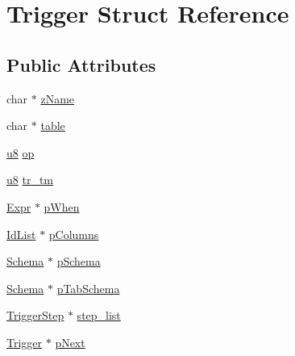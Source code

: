 \hypertarget{struct_trigger}{\section{Trigger Struct Reference}
\label{struct_trigger}
}
\subsection*{Public Attributes}
\begin{DoxyCompactItemize}
\item 
char $\ast$ \hyperlink{struct_trigger_a9aecea5dadd7ae93b7f585c4b914791c}{z\-Name}
\item 
char $\ast$ \hyperlink{struct_trigger_ab9d5500f7fc43382e867733a2968ecae}{table}
\item 
\hyperlink{sqlite3_8c_a74a0f6424ae628af25f23f0a35f6ead3}{u8} \hyperlink{struct_trigger_a855d6b6a302d8d80e1d30ddd70fd403e}{op}
\item 
\hyperlink{sqlite3_8c_a74a0f6424ae628af25f23f0a35f6ead3}{u8} \hyperlink{struct_trigger_af0d10da140b068bfd76aaeb6607fa6cf}{tr\-\_\-tm}
\item 
\hyperlink{struct_expr}{Expr} $\ast$ \hyperlink{struct_trigger_a1b6cdd46e8b98562920d1acee86281ed}{p\-When}
\item 
\hyperlink{struct_id_list}{Id\-List} $\ast$ \hyperlink{struct_trigger_a8505fbdf63ca9eadf4b2585e99faa4e4}{p\-Columns}
\item 
\hyperlink{struct_schema}{Schema} $\ast$ \hyperlink{struct_trigger_a83edbfa91ce6520a6ebc1a21acc2cd5e}{p\-Schema}
\item 
\hyperlink{struct_schema}{Schema} $\ast$ \hyperlink{struct_trigger_a8e4a9b3f4bcc5c645e1777b3bb94a6d8}{p\-Tab\-Schema}
\item 
\hyperlink{struct_trigger_step}{Trigger\-Step} $\ast$ \hyperlink{struct_trigger_a4206faaae6cdf1a2b22a2c9f15c88642}{step\-\_\-list}
\item 
\hyperlink{struct_trigger}{Trigger} $\ast$ \hyperlink{struct_trigger_ac28107e1c45789e0146fe45867b8dfdb}{p\-Next}
\end{DoxyCompactItemize}


